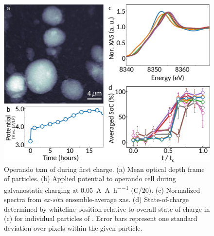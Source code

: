 \documentclass{article}
\begin{document}
\begin{figure}
  \includegraphics{figures/nca_txm.pdf}
  \caption{Operando \gls{txm} of \nca{} during first charge. (a) Mean
    optical depth frame of \nca{} particles. (b) Applied potential to
    operando cell during galvanostatic charging at
    \SI{0.05}{\ampere\per\ampere\per\hour} (C/20). (c) Normalized spectra
    from \emph{ex-situ} ensemble-average \gls{xas}. (d)
    State-of-charge determined by whiteline position relative to
    overall state of charge in (c) for individual particles of
    \nca{}. Error bars represent one standard deviation over pixels
    within the given particle.}
  \label{fig:txm-nca}
\end{figure}
\end{document}
